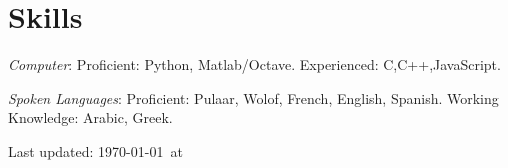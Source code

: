 \documentclass[12pt,letterpaper]{article}
\def\HCode#1{}
\renewenvironment{itemize}{
  \begin{list}{}{
    \setlength{\leftmargin}{1.5em}
    \setlength{\itemsep}{0.25em}
    \setlength{\parskip}{0pt}
    \setlength{\parsep}{0.25em}
  }
}{
  \end{list}
}
\begin{document}
%



\HCode{<a name="journalpapers"></a>}
%




%
%
%
%
%
%

\section*{Skills}

\begin{itemize}
  \item \emph{Computer}: Proficient: Python, Matlab/Octave. Experienced: C,C++,JavaScript.
  \item \emph{Spoken Languages}: Proficient: Pulaar, Wolof, French, English, Spanish. Working Knowledge: Arabic, Greek.
\end{itemize}

%


\vfill
\HCode{<center>}
\begin{center}
    \begin{small}
        Last updated: \today\ at \currenttime
    \end{small}
\end{center}
\HCode{</center>}



\HCode{</div>} %
\HCode{</div>} %
\HCode{</div>} %
\end{document}
